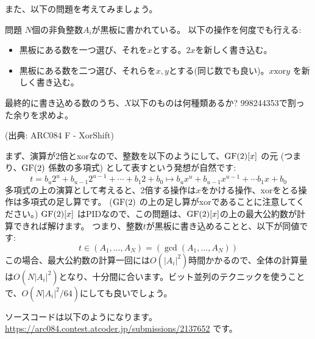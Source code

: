 \documentclass{jsarticle}
\begin{document}
 また、以下の問題を考えてみましょう。
 \begin{itembox}[l]{問題}
  $N$個の非負整数$A_i$が黒板に書かれている。
  以下の操作を何度でも行える:
  \begin{itemize}
   \item 黒板にある数を一つ選び、それを$x$とする。$2x$を新しく書き込む。
   \item 黒板にある数を二つ選び、それらを$x,y$とする(同じ数でも良い)。$x \mathbin{\mathrm{xor}} y$ を新しく書き込む。
  \end{itemize}
  最終的に書き込める数のうち、$X$以下のものは何種類あるか? 998244353で割った余りを求めよ。

  (出典: ARC084 F - XorShift)
 \end{itembox}
 まず、演算が2倍とxorなので、整数を以下のようにして、$\mathrm{GF}(2)[x]$ の元
 (つまり、$\mathrm{GF}(2)$ 係数の多項式) として表すという発想が自然です:
 \begin{displaymath}
  t = b_u 2^u + b_{u-1}2^{u-1} + \cdots + b_1 2 + b_0 \mapsto
  b_u x^u + b_{u-1} x^{u-1} + \cdots b_1 x + b_0
 \end{displaymath}
 多項式の上の演算として考えると、2倍する操作は$x$をかける操作、xorをとる操作は多項式の足し算です。 ($\mathrm{GF}(2)$ の上の足し算がxorであることに注意してください。)
 $\mathrm{GF}(2)[x]$ はPIDなので、この問題は、$\mathrm{GF}(2)[x]$の上の最大公約数が計算できれば解けます。
 つまり、整数$t$が黒板に書き込めることと、以下が同値です:
 \begin{displaymath}
  t \in (A_1, \ldots, A_N) = (\gcd(A_1, \ldots, A_N))
 \end{displaymath}
 この場合、最大公約数の計算一回には$O(|A_i|^2)$時間かかるので、全体の計算量は$O(N|A_i|^2)$となり、十分間に合います。ビット並列のテクニックを使うことで、$O(N|A_i|^2/64)$にしても良いでしょう。

 ソースコードは以下のようになります。\url{https://arc084.contest.atcoder.jp/submissions/2137652} です。
 
\printindex


\end{document}

